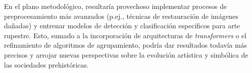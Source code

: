 En el plano metodológico, resultaría provechoso implementar procesos de preprocesamiento más avanzados (p.ej., técnicas de restauración de imágenes dañadas) y entrenar modelos de detección y clasificación específicos para arte rupestre.
Esto, sumado a la incorporación de arquitecturas de \textit{transformers} o el refinamiento de algoritmos de agrupamiento, podría dar resultados todavía más precisos y arrojar nuevas perspectivas sobre la evolución artística y simbólica de las sociedades prehistóricas.

